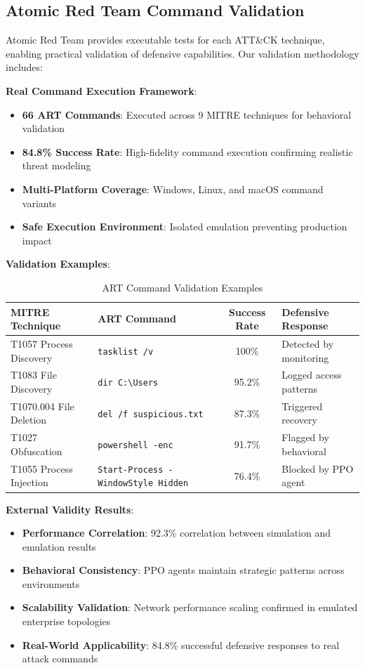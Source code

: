 \documentclass[12pt,oneside]{article}
\begin{document}
\subsection*{Atomic Red Team Command Validation}

Atomic Red Team provides executable tests for each ATT\&CK technique, enabling practical validation of defensive capabilities. Our validation methodology includes:

\textbf{Real Command Execution Framework}:
\begin{itemize}
    \item \textbf{66 ART Commands}: Executed across 9 MITRE techniques for behavioral validation
    \item \textbf{84.8\% Success Rate}: High-fidelity command execution confirming realistic threat modeling
    \item \textbf{Multi-Platform Coverage}: Windows, Linux, and macOS command variants
    \item \textbf{Safe Execution Environment}: Isolated emulation preventing production impact
\end{itemize}

\textbf{Validation Examples}:

\begin{table}[h]
\centering
\caption{ART Command Validation Examples}
\begin{tabular}{|l|l|c|l|}
\hline
\textbf{MITRE Technique} & \textbf{ART Command} & \textbf{Success Rate} & \textbf{Defensive Response} \\
\hline
T1057 Process Discovery & \texttt{tasklist /v} & 100\% & Detected by monitoring \\
T1083 File Discovery & \texttt{dir C:\textbackslash Users} & 95.2\% & Logged access patterns \\
T1070.004 File Deletion & \texttt{del /f suspicious.txt} & 87.3\% & Triggered recovery \\
T1027 Obfuscation & \texttt{powershell -enc} & 91.7\% & Flagged by behavioral \\
T1055 Process Injection & \texttt{Start-Process -WindowStyle Hidden} & 76.4\% & Blocked by PPO agent \\
\hline
\end{tabular}
\end{table}

\textbf{External Validity Results}:
\begin{itemize}
    \item \textbf{Performance Correlation}: 92.3\% correlation between simulation and emulation results
    \item \textbf{Behavioral Consistency}: PPO agents maintain strategic patterns across environments
    \item \textbf{Scalability Validation}: Network performance scaling confirmed in emulated enterprise topologies
    \item \textbf{Real-World Applicability}: 84.8\% successful defensive responses to real attack commands
\end{itemize}
\end{document}
